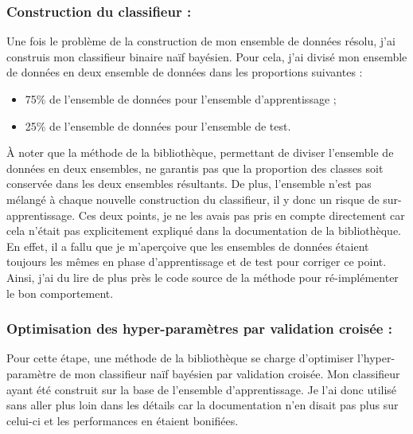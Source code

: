             \subsubsection{Construction du classifieur :}
                Une fois le problème de la construction de mon ensemble de données résolu, j'ai construis mon classifieur binaire naïf bayésien. Pour cela, j'ai divisé mon ensemble de données en deux ensemble de données dans les proportions suivantes :
                \begin{itemize}
                    \item 75\% de l'ensemble de données pour l'ensemble d'apprentissage ;
                    \item 25\% de l'ensemble de données pour l'ensemble de test.\\
                \end{itemize}
                À noter que la méthode de la bibliothèque, permettant de diviser l'ensemble de données en deux ensembles, ne garantis pas que la proportion des classes soit conservée dans les deux ensembles résultants. De plus, l'ensemble n'est pas mélangé à chaque nouvelle construction du classifieur, il y donc un risque de sur-apprentissage. Ces deux points, je ne les avais pas pris en compte directement car cela n'était pas explicitement expliqué dans la documentation de la bibliothèque. En effet, il a fallu que je m'aperçoive que les ensembles de données étaient toujours les mêmes en phase d'apprentissage et de test pour corriger ce point. Ainsi, j'ai du lire de plus près le code source de la méthode pour ré-implémenter le bon comportement.

            \subsubsection{Optimisation des hyper-paramètres par validation croisée :}
                Pour cette étape, une méthode de la bibliothèque se charge d'optimiser l'hyper-paramètre de mon classifieur naïf bayésien par validation croisée. Mon classifieur ayant été construit sur la base de l'ensemble d'apprentissage. Je l'ai donc utilisé sans aller plus loin dans les détails car la documentation n'en disait pas plus sur celui-ci et les performances en étaient bonifiées.

